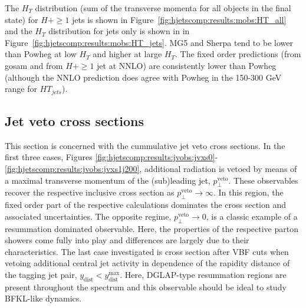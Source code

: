 The $H_T$ distribution (sum of the transverse momenta for all objects
in the final state) for $H+\ge1$ jets is shown in
Figure~\ref{fig:hjetscomp:results:mobs:HT_all} and the $H_T$
distribution for jets only is shown in in
Figure~\ref{fig:hjetscomp:results:mobs:HT_jets}. 
MG5 and Sherpa tend to be lower than Powheg at low $H_T$ and higher at
large $H_T$. The fixed order predictions (from gosam and from $H+\ge1$
jet at NNLO) are consistently lower than Powheg (although the NNLO
prediction does agree with Powheg in the 150-300 GeV range for
$HT_{jets}$).



\clearpage
\subsection{Jet veto cross sections}
\label{sec:hjetscomp:results:jvobs}

This section is concerned with the cummulative jet veto cross sections. 
In the first three cases, Figures 
\ref{fig:hjetscomp:results:jvobs:jvxs0}-\ref{fig:hjetscomp:results:jvobs:jvxs1j200}, 
additional radiation is vetoed by means of a maximal transverse 
momentum of the (sub)leading jet, $p_\perp^\text{veto}$. These 
observables recover the respective inclusive cross section as 
$p_\perp^\text{veto}\to\infty$. In this region, the fixed order 
part of the respective calculations dominates the cross section 
and associated uncertainties. The opposite regime, $p_\perp^\text{veto}\to 0$, 
is a classic example of a resummation dominated observable. Here, the 
properties of the respective parton showers come fully into play and 
differences are largely due to their characteristics. The last case 
investigated is cross section after VBF cuts when vetoing additional 
central jet activity in dependence of the rapidity distance of the 
tagging jet pair, $y_\text{dist}<y_\text{dist}^\text{max}$. Here, 
DGLAP-type resummation regions are present throughout the spectrum and 
this observable should be ideal to study BFKL-like dynamics.

